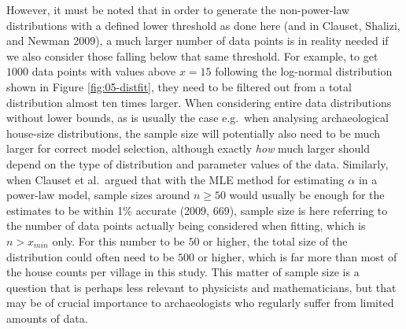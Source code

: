 \documentclass[
  12pt,
  a4paper, twoside]{book}
\begin{document}
However, it must be noted that in order to generate the non-power-law distributions with a defined lower threshold as done here (and in Clauset, Shalizi, and Newman 2009), a much larger number of data points is in reality needed if we also consider those falling below that same threshold. For example, to get \(1000\) data points with values above \(x = 15\) following the log-normal distribution shown in Figure \ref{fig:05-distfit}, they need to be filtered out from a total distribution almost ten times larger. When considering entire data distributions without lower bounds, as is usually the case e.g.~when analysing archaeological house-size distributions, the sample size will potentially also need to be much larger for correct model selection, although exactly \emph{how} much larger should depend on the type of distribution and parameter values of the data. Similarly, when Clauset et al.~argued that with the MLE method for estimating \(\alpha\) in a power-law model, sample sizes around \(n \geq 50\) would usually be enough for the estimates to be within 1\% accurate (2009, 669), sample size is here referring to the number of data points actually being considered when fitting, which is \(n > x_{min}\) only. For this number to be \(50\) or higher, the total size of the distribution could often need to be \(500\) or higher, which is far more than most of the house counts per village in this study. This matter of sample size is a question that is perhaps less relevant to physicists and mathematicians, but that may be of crucial importance to archaeologists who regularly suffer from limited amounts of data.
\end{document}

